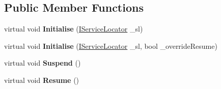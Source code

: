 \subsection*{Public Member Functions}
\begin{DoxyCompactItemize}
\item 
\mbox{\label{class_g_m_t_b_1_1_abstracts_1_1_level_a0048401bb0fb66b0fb0c19b3b25e4265}} 
virtual void {\bfseries Initialise} (\mbox{\hyperlink{interface_g_m_t_b_1_1_interfaces_1_1_i_service_locator}{I\+Service\+Locator}} \+\_\+sl)
\item 
\mbox{\label{class_g_m_t_b_1_1_abstracts_1_1_level_a68659ce713c8bd1ca17cebb001f0fd65}} 
virtual void {\bfseries Initialise} (\mbox{\hyperlink{interface_g_m_t_b_1_1_interfaces_1_1_i_service_locator}{I\+Service\+Locator}} \+\_\+sl, bool \+\_\+override\+Resume)
\item 
\mbox{\label{class_g_m_t_b_1_1_abstracts_1_1_level_a087ddc187855a472e6d11692e86573fb}} 
virtual void {\bfseries Suspend} ()
\item 
\mbox{\label{class_g_m_t_b_1_1_abstracts_1_1_level_a06d1dddb97da6fe34a062d2528a51390}} 
virtual void {\bfseries Resume} ()
\end{DoxyCompactItemize}
